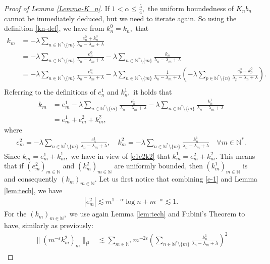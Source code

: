\documentclass[11pt, dvipsnames]{amsart}
\begin{document}
{\begin{proof}[Proof of Lemma \ref{Lemma-K_n}]
If $1<\alpha\leq\frac{5}{4},$ the uniform boundedness of $K_n b_n$ cannot be immediately deduced, but we need to iterate again. So using the definition \eqref{kn-def}, we have from $k_n^0=k_n,$ that
\begin{align*}
     k_m&=-\lambda\sum_{n\in \mathbb{N}^*\setminus\{m\}}\frac{e_n^0+k_n^0}{\lambda_n-\lambda_m+\lambda}\\
     &=-\lambda\sum_{n\in \mathbb{N}^*\setminus\{m\}}\frac{e_n^0}{\lambda_n-\lambda_m+\lambda}-\lambda\sum_{n\in \mathbb{N}^*\setminus\{m\}}\frac{k_n}{\lambda_n-\lambda_m+\lambda}\\
     &=-\lambda\sum_{n\in \mathbb{N}^*\setminus\{m\}}\frac{e_n^0}{\lambda_n-\lambda_m+\lambda}-\lambda\sum_{n\in \mathbb{N}^*\setminus\{m\}}\frac{1}{\lambda_n-\lambda_m+\lambda}\left(-\lambda\sum_{p\in \mathbb{N}^*\setminus\{n\}}\frac{e_p^0+k_p^0}{\lambda_p-\lambda_n+\lambda}\right).\\
\end{align*}
Referring to the definitions of $e_n^1$ and $k_n^1,$ it holds that
\begin{align}
 k_m&=e_m^1-\lambda\sum_{n\in \mathbb{N}^*\setminus\{m\}}\frac{e_n^1}{\lambda_n-\lambda_m+\lambda} -\lambda\sum_{n\in \mathbb{N}^*\setminus\{m\}}\frac{k_n^1}{\lambda_n-\lambda_m+\lambda}\nonumber\\
 &=e_m^1+e_m^2+k_m^2,\label{e1e2k2}
\end{align} where
\begin{align*}
  e_m^2=  -\lambda\sum_{n\in \mathbb{N}^*\setminus\{m\}}\frac{e_n^1}{\lambda_n-\lambda_m+\lambda}, \quad k_m^2=-\lambda\sum_{n\in \mathbb{N}^*\setminus\{m\}}\frac{k_n^1}{\lambda_n-\lambda_m+\lambda} \quad \forall m\in \mathbb{N}^*.
\end{align*}
Since $k_m=e_m^1+k_m^1,$ we have in view of \eqref{e1e2k2} that $k_m^1=e_m^2+k_m^2.$ This means that if $(e_m^2)_{m\in \mathbb{N}}$ and $(k_m^2)_{m\in \mathbb{N}}$ are uniformly bounded, then $(k_m^1)_{m\in \mathbb{N}}$ is and consequently $(k_m)_{m\in \mathbb{N}}.$ Let us first notice that combining \eqref{e-1} and Lemma \ref{lem:tech}, we have
\begin{align*}
    |e_m^2|\lesssim m^{1-\alpha}\log n+m^{-\alpha}\lesssim 1.
\end{align*}
For the $(k_m)_{m\in \mathbb{N}},$ we use again Lemma \eqref{lem:tech}  and Fubini's Theorem to have, similarly as previously:
\begin{align*}
    \|(m^{-\varepsilon} k_m^2)_m\|_{l^2}&\lesssim \sum_{m\in \mathbb{N}^*}m^{-2\varepsilon}\left(\sum_{n\in \mathbb{N}^*\setminus\{m\}}\frac{k_n^1}{\lambda_n-\lambda_m+\lambda}\right)^2\\

\end{align*}
\end{proof}}
\end{document}
